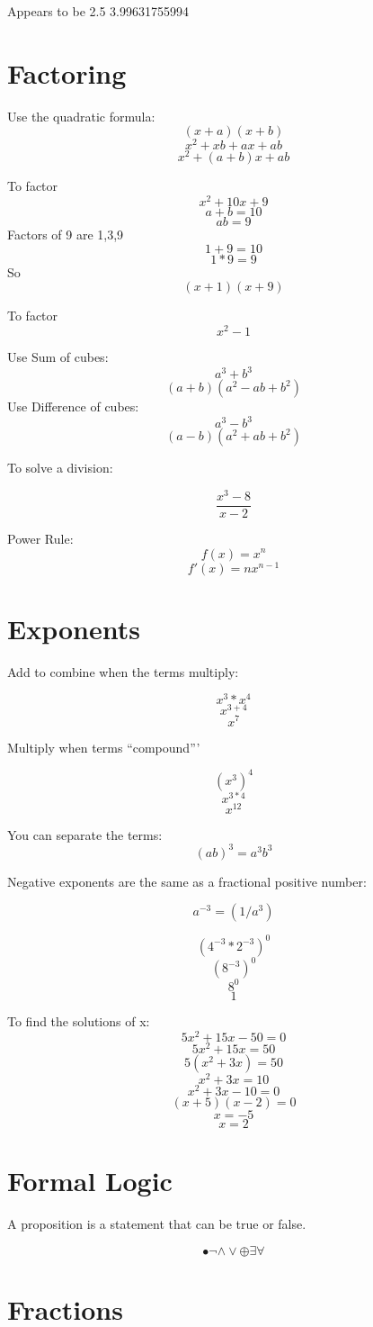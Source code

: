 \documentclass{article}
\begin{document}
Appears to be 2.5
3.99631755994

\section{Factoring}

Use the quadratic formula:
$$(x+a)(x+b)$$
$$x^2+xb+ax+ab$$
$$x^2+(a+b)x+ab$$

To factor $$x^2+10x+9$$
$$a+b = 10$$
$$ab = 9$$
Factors of 9 are 1,3,9
$$1+9 = 10$$
$$1*9 = 9$$
So
$$(x+1)(x+9)$$

To factor $$x^2-1$$

Use Sum of cubes:
$$a^3+b^3$$
$$(a+b)(a^2-ab+b^2)$$
Use Difference of cubes:
$$a^3-b^3$$
$$(a-b)(a^2+ab+b^2)$$

To solve a division:

$$\frac{x^3-8}{x-2}$$

Power Rule:
$$f(x)=x^n$$
$$f'(x)=nx^{n-1}$$


\section{Exponents}

Add to combine when the terms multiply:

$$x^3*x^4$$
$$x^{3+4}$$
$$x^7$$

Multiply when terms ``compound'''

$$(x^3)^4$$
$$x^{3*4}$$
$$x^{12}$$


You can separate the terms:
$$(ab)^3 = a^3b^3$$

Negative exponents are the same as a fractional positive number:

$$a^{-3} = (1/a^3)$$


$$(4^{-3}*2^{-3})^0$$
$$(8^{-3})^0$$
$$8^{0}$$
$$1$$

To find the solutions of x:
$$5x^2+15x-50=0$$
$$5x^2+15x=50$$
$$5(x^2+3x)=50$$
$$x^2+3x=10$$
$$x^2+3x-10=0$$
$$(x+5)(x-2)=0$$
$$x=-5$$
$$x=2$$

\section{Formal Logic}

A proposition is a statement that can be true or false.

\begin{equation}
	\bullet	
  \neg	
	\wedge	
	\vee	
	\oplus	
	\exists	
	\forall	
\end{equation}

\section{Fractions}
\end{document}
